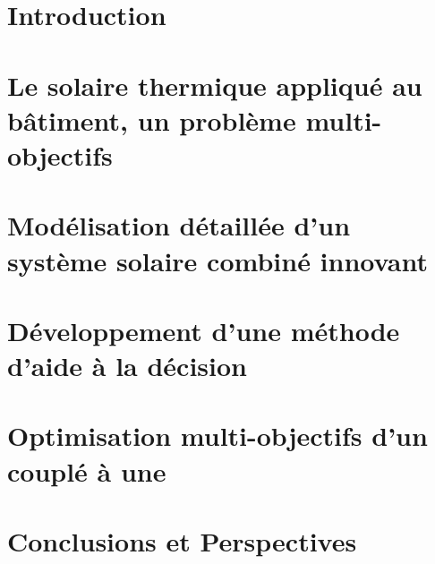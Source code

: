 \documentclass[11pt, oneside]{JeremyThesis}
\begin{document}
\chapter*{Introduction}
%
%


\chapter{Le solaire thermique appliqué au bâtiment, un problème multi-objectifs}


\chapter{Modélisation détaillée d’un système solaire combiné innovant}


\chapter{Développement d’une méthode d’aide à la décision}


\chapter{Optimisation multi-objectifs d’un  couplé à une }


\chapter*{Conclusions et Perspectives}
%
%



\clearpage
\thesisPrintbibliography
\end{document}
